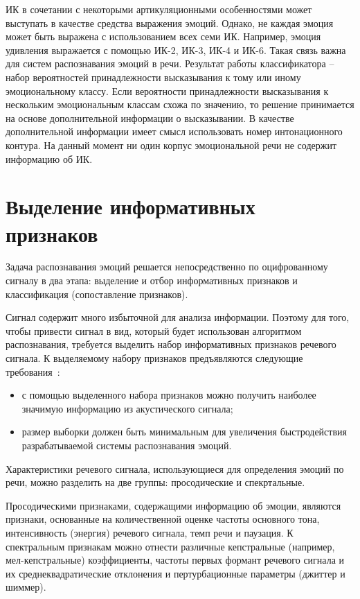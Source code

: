 ИК в сочетании с некоторыми артикуляционными особенностями может выступать в качестве средства выражения эмоций. Однако, не каждая эмоция может быть выражена с использованием всех семи ИК. Например, эмоция удивления выражается с помощью ИК-2, ИК-3, ИК-4 и ИК-6. \cite{conn} Такая связь важна для систем распознавания эмоций в речи. Результат работы классификатора -- набор вероятностей принадлежности высказывания к тому или иному эмоциональному классу. Если вероятности принадлежности высказывания к нескольким эмоциональным классам схожа по значению, то решение принимается на основе дополнительной информации о высказывании. В качестве дополнительной информации имеет смысл использовать номер интонационного контура. На данный момент ни один корпус эмоциональной речи не содержит информацию об ИК.

\section{Выделение информативных признаков}

Задача распознавания эмоций решается непосредственно по оцифрованному сигналу в два этапа: выделение и отбор информативных признаков и классификация (сопоставление признаков).

Сигнал содержит много избыточной для анализа информации. Поэтому для того, чтобы привести сигнал в вид, который будет использован алгоритмом распознавания, требуется выделить набор информативных признаков речевого сигнала. К выделяемому набору признаков предъявляются следующие требования~\cite{features-must}: 
\begin{itemize}
	\item с помощью выделенного набора признаков можно получить наиболее значимую информацию из акустического сигнала;
	\item размер выборки должен быть минимальным для увеличения быстродействия разрабатываемой системы распознавания эмоций.
\end{itemize}
Характеристики речевого сигнала, использующиеся для определения эмоций по речи, можно разделить на две группы: просодические и спекртальные. 

Просодическими признаками, содержащими информацию об эмоции, являются признаки, основанные на количественной оценке частоты основного тона, интенсивность (энергия) речевого сигнала, темп речи и паузация. К спектральным признакам можно отнести различные кепстральные (например, мел-кепстральные) коэффициенты, частоты первых формант речевого сигнала и их среднеквадратические отклонения и пертурбационные параметры (джиттер и шиммер).

